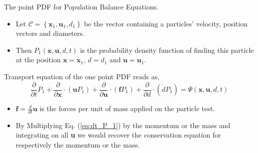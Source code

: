 \documentclass{sintefbeamer}
\newcommand{\ddt}{\frac{d}{d t}}
\newcommand{\pddt}{\frac{\partial}{\partial t}}
\begin{document}
\begin{frame}{The point PDF for Population Balance Equations.}
  \begin{definition}
    \begin{itemize}
      \item Let $\mathscr{C} =\left\{\textbf{x}_1,\textbf{u}_1,d_1\right\}$ be the vector containing a  particles' velocity, position vectors and diameters. 
      \item Then $P_1(\textbf{x},\textbf{u},d,t)$ is the probability density function of finding this particle at the position $\textbf{x} = \textbf{x}_1$, $d = d_1$ and $\textbf{u} = \textbf{u}_1$.  
    \end{itemize}
  \end{definition}
  Transport equation of the one point PDF reads as,
  \begin{equation}
    \pddt P_1
    + \frac{\partial}{\partial \textbf{x}} \cdot
    (\textbf{u}P_1)
    + \frac{\partial}{\partial \textbf{u}} \cdot
    (\textbf{f}P_1)
    + \frac{\partial}{\partial d} \cdot
    (\dot{d} P_1)
    = \Psi(\textbf{x},\textbf{u},d,t)
    \label{eq:dt_P_1}
\end{equation}

  \begin{itemize}
    \item $\textbf{f} = \ddt \textbf{u}$ is the forces per unit of mass applied on the particle test. 
    \item By Multiplying Eq. (\ref{eq:dt_P_1}) by the momentum or the mass and integrating on all \textbf{u} we would recover the conservation equation for respectively the momentum or the mass. 
  \end{itemize}
\end{frame}
\end{document}
